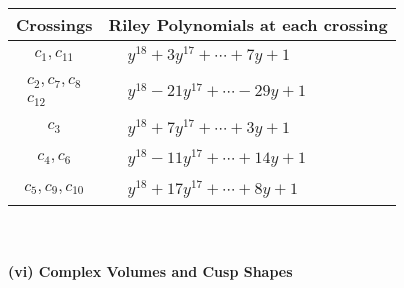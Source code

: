 \documentclass[1p]{elsarticle_modified}
\theoremstyle{definition}
\begin{document}
\begin{tabular}{m{50pt}|m{274pt}}
Crossings & \hspace{64pt}Riley Polynomials at each crossing \\
\hline $$\begin{aligned}c_{1},c_{11}\end{aligned}$$&$\begin{aligned}
&y^{18}+3 y^{17}+\cdots+7 y+1
\end{aligned}$\\
\hline $$\begin{aligned}c_{2},c_{7},c_{8}\\c_{12}\end{aligned}$$&$\begin{aligned}
&y^{18}-21 y^{17}+\cdots-29 y+1
\end{aligned}$\\
\hline $$\begin{aligned}c_{3}\end{aligned}$$&$\begin{aligned}
&y^{18}+7 y^{17}+\cdots+3 y+1
\end{aligned}$\\
\hline $$\begin{aligned}c_{4},c_{6}\end{aligned}$$&$\begin{aligned}
&y^{18}-11 y^{17}+\cdots+14 y+1
\end{aligned}$\\
\hline $$\begin{aligned}c_{5},c_{9},c_{10}\end{aligned}$$&$\begin{aligned}
&y^{18}+17 y^{17}+\cdots+8 y+1
\end{aligned}$\\
\hline
\end{tabular}\\~\\
\newpage\flushleft \textbf{(vi) Complex Volumes and Cusp Shapes}
\end{document}

